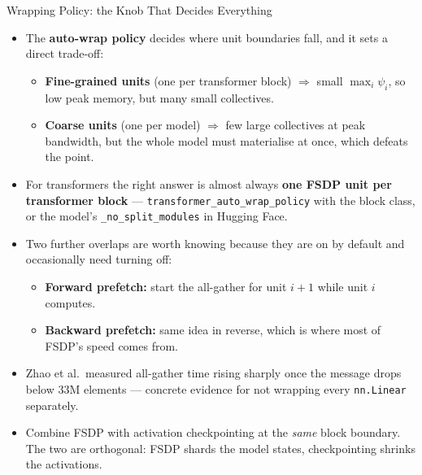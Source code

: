 \begin{frame}[allowframebreaks]{Wrapping Policy: the Knob That Decides Everything}
  \begin{itemize}\itemsep0.4em
    \item[\textcolor{red}{$\blacktriangleright$}] The \textbf{auto-wrap policy} decides where unit boundaries fall, and it sets a direct trade-off:
      \begin{itemize}\itemsep0.2em\footnotesize
        \item \textbf{Fine-grained units} (one per transformer block) $\Rightarrow$ small $\max_i \psi_i$, so low peak memory, but many small collectives.
        \item \textbf{Coarse units} (one per model) $\Rightarrow$ few large collectives at peak bandwidth, but the whole model must materialise at once, which defeats the point.
      \end{itemize}
    \item[\textcolor{red}{$\blacktriangleright$}] For transformers the right answer is almost always \textbf{one FSDP unit per transformer block} --- \texttt{transformer\_auto\_wrap\_policy} with the block class, or the model's \texttt{\_no\_split\_modules} in Hugging Face.
    \item[\textcolor{red}{$\blacktriangleright$}] Two further overlaps are worth knowing because they are on by default and occasionally need turning off:
      \begin{itemize}\itemsep0.2em\footnotesize
        \item \textbf{Forward prefetch:} start the all-gather for unit $i+1$ while unit $i$ computes.
        \item \textbf{Backward prefetch:} same idea in reverse, which is where most of FSDP's speed comes from.
      \end{itemize}
    \item[\textcolor{red}{$\blacktriangleright$}] Zhao et al.\ measured all-gather time rising sharply once the message drops below $33$M elements --- concrete evidence for not wrapping every \texttt{nn.Linear} separately.
    \item[\textcolor{red}{$\blacktriangleright$}] Combine FSDP with activation checkpointing at the \emph{same} block boundary. The two are orthogonal: FSDP shards the model states, checkpointing shrinks the activations.
  \end{itemize}
\end{frame}

